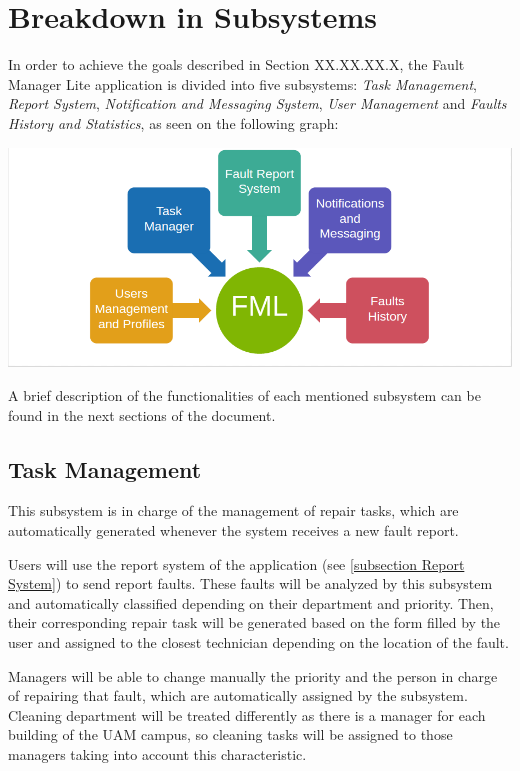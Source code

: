 \section{Breakdown in Subsystems}


In order to achieve the goals described in Section XX.XX.XX.X, the Fault Manager Lite application is divided into five subsystems: \emph{Task Management}, \emph{Report System}, \emph{Notification and Messaging System}, \emph{User Management} and \emph{Faults History and Statistics}, as seen on the following graph:

\includegraphics[scale=0.45]{img/subsystems.png}

A brief description of the functionalities of each mentioned subsystem can be found in the next sections of the document.


\subsection{Task Management}
\label{subsection Task Management}

This subsystem is in charge of the management of repair tasks, which are automatically generated whenever the system receives a new fault report.

Users will use the report system of the application (see \ref{subsection Report System}) to send report faults. These faults will be analyzed by this subsystem and  automatically classified depending on their department and priority. Then, their corresponding repair task will be generated based on the form filled by the user and assigned to the closest technician depending on the location of the fault.

Managers will be able to change manually the priority and the person in charge of repairing that fault, which are automatically assigned by the subsystem. Cleaning department will be treated differently as there is a manager for each building of the UAM campus, so cleaning tasks will be assigned to those managers taking into account this characteristic.

